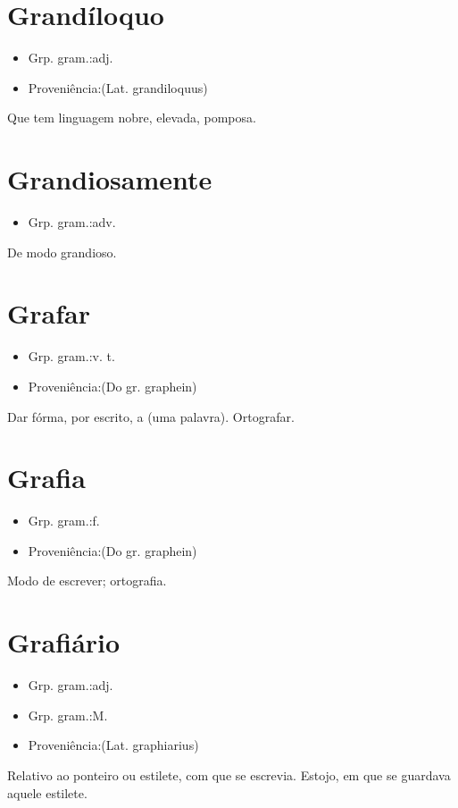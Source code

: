\section{Grandíloquo}
\begin{itemize}
\item {Grp. gram.:adj.}
\end{itemize}
\begin{itemize}
\item {Proveniência:(Lat. \textunderscore grandiloquus\textunderscore )}
\end{itemize}
Que tem linguagem nobre, elevada, pomposa.
\section{Grandiosamente}
\begin{itemize}
\item {Grp. gram.:adv.}
\end{itemize}
De modo grandioso.
\section{Grafar}
\begin{itemize}
\item {Grp. gram.:v. t.}
\end{itemize}
\begin{itemize}
\item {Proveniência:(Do gr. \textunderscore graphein\textunderscore )}
\end{itemize}
Dar fórma, por escrito, a (uma palavra).
Ortografar.
\section{Grafia}
\begin{itemize}
\item {Grp. gram.:f.}
\end{itemize}
\begin{itemize}
\item {Proveniência:(Do gr. \textunderscore graphein\textunderscore )}
\end{itemize}
Modo de escrever; ortografia.
\section{Grafiário}
\begin{itemize}
\item {Grp. gram.:adj.}
\end{itemize}
\begin{itemize}
\item {Grp. gram.:M.}
\end{itemize}
\begin{itemize}
\item {Proveniência:(Lat. \textunderscore graphiarius\textunderscore )}
\end{itemize}
Relativo ao ponteiro ou estilete, com que se escrevia.
Estojo, em que se guardava aquele estilete.

